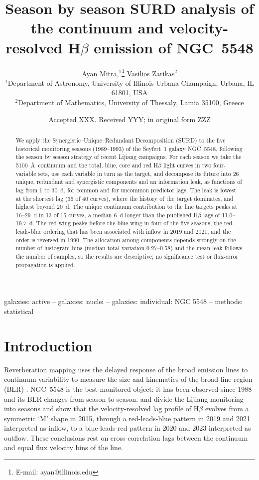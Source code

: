 \documentclass[fleqn,usenatbib]{mnras}
\title[SURD in five seasons of NGC 5548]{Season by season SURD analysis of the continuum and velocity-resolved H$\beta$ emission of NGC~5548}
\author[A. Mitra \& V. Zarikas]{
Ayan Mitra,$^{1}$\thanks{E-mail: ayan@illinois.edu}
Vasilios Zarikas$^{2}$
\\
$^{1}$Department of Astronomy, University of Illinois Urbana-Champaign, Urbana, IL 61801, USA\\
$^{2}$Department of Mathematics, University of Thessaly, Lamia 35100, Greece
}
\date{Accepted XXX. Received YYY; in original form ZZZ}
\begin{document}
\label{firstpage}
\pagerange{\pageref{firstpage}--\pageref{LastPage}}
\maketitle

\begin{abstract}
We apply the Synergistic--Unique--Redundant Decomposition (SURD) to the five historical monitoring seasons (1989--1993) of the Seyfert~1 galaxy NGC~5548, following the season by season strategy of recent Lijiang campaigns. For each season we take the 5100~\AA\ continuum and the total, blue, core and red H$\beta$ light curves in two four-variable sets, use each variable in turn as the target, and decompose its future into 26 unique, redundant and synergistic components and an information leak, as functions of lag from 1 to 30~d, for common and for uncommon predictor lags. The leak is lowest at the shortest lag (36 of 40 curves), where the history of the target dominates, and highest beyond 20~d. The unique continuum contribution to the line targets peaks at 16--29~d in 13 of 15 curves, a median 6~d longer than the published H$\beta$ lags of 11.0--19.7~d. The red wing peaks before the blue wing in four of the five seasons, the red-leads-blue ordering that has been associated with inflow in 2019 and 2021, and the order is reversed in 1990. The allocation among components depends strongly on the number of histogram bins (median total variation 0.27--0.58) and the mean leak follows the number of samples, so the results are descriptive; no significance test or flux-error propagation is applied.
\end{abstract}
\begin{keywords}
galaxies: active -- galaxies: nuclei -- galaxies: individual: NGC 5548 -- methods: statistical
\end{keywords}

\section{Introduction}
Reverberation mapping uses the delayed response of the broad emission lines to continuum variability to measure the size and kinematics of the broad-line region (BLR) \citep{Peterson2004ApJ}. NGC~5548 is the best monitored object: it has been observed since 1988 and its BLR changes from season to season. \citet{Lu2022} and \citet{Xi2025} divide the Lijiang monitoring into seasons and show that the velocity-resolved lag profile of H$\beta$ evolves from a symmetric `M' shape in 2015, through a red-leads-blue pattern in 2019 and 2021 interpreted as inflow, to a blue-leads-red pattern in 2020 and 2023 interpreted as outflow. These conclusions rest on cross-correlation lags between the continuum and equal flux velocity bins of the line.
\end{document}
